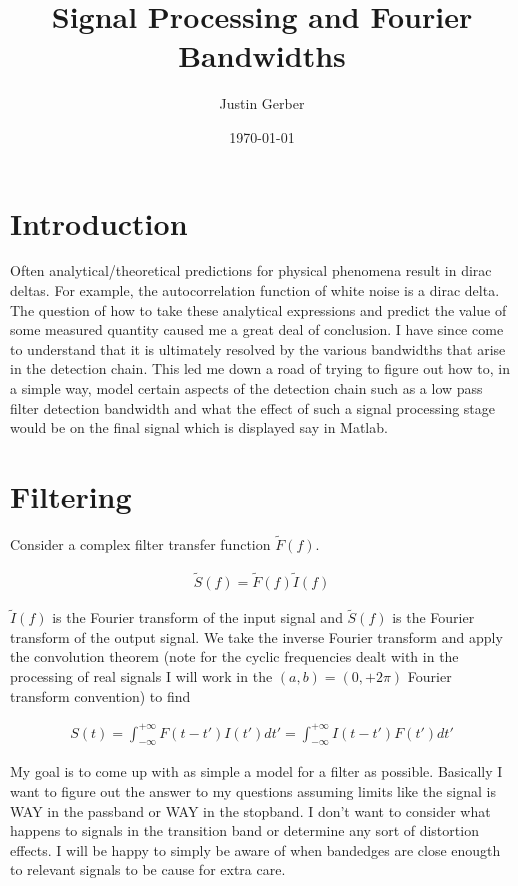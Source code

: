 \documentclass[12pt]{article}
\begin{document}
\title{Signal Processing and Fourier Bandwidths}
\author{Justin Gerber}
\date{\today}
\maketitle

\section{Introduction}
Often analytical/theoretical predictions for physical phenomena result in dirac deltas. For example, the autocorrelation function of white noise is a dirac delta. The question of how to take these analytical expressions and predict the value of some measured quantity caused me a great deal of conclusion. I have since come to understand that it is ultimately resolved by the various bandwidths that arise in the detection chain.
This led me down a road of trying to figure out how to, in a simple way, model certain aspects of the detection chain such as a low pass filter detection bandwidth and what the effect of such a signal processing stage would be on the final signal which is displayed say in Matlab.

\section{Filtering}
Consider a complex filter transfer function $\tilde{F}(f)$.

\begin{align}
\tilde{S}(f) = \tilde{F}(f) \tilde{I}(f)
\end{align}

$\tilde{I}(f)$ is the Fourier transform of the input signal and $\tilde{S}(f)$ is the Fourier transform of the output signal. We take the inverse Fourier transform and apply the convolution theorem (note for the cyclic frequencies dealt with in the processing of real signals I will work in the $(a,b) = (0,+2\pi)$ Fourier transform convention) to find

\begin{align}
S(t) = \int_{-\infty}^{+\infty} F(t-t')I(t') dt' = \int_{-\infty}^{+\infty} I(t-t') F(t') dt'
\end{align}

My goal is to come up with as simple a model for a filter as possible. Basically I want to figure out the answer to my questions assuming limits like the signal is WAY in the passband or WAY in the stopband. I don't want to consider what happens to signals in the transition band or determine any sort of distortion effects. I will be happy to simply be aware of when bandedges are close enougth to relevant signals to be cause for extra care.
\end{document}
